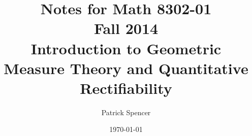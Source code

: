 \documentclass[12pt,makeidx]{amsbook}
\begin{document}
\title{Notes for Math 8302-01 \\ Fall 2014 \\ Introduction to
Geometric Measure Theory and Quantitative Rectifiability}
\author{Patrick Spencer}

\date{\today}
\maketitle
\tableofcontents




\printindex
\printglossaries



\end{document}
